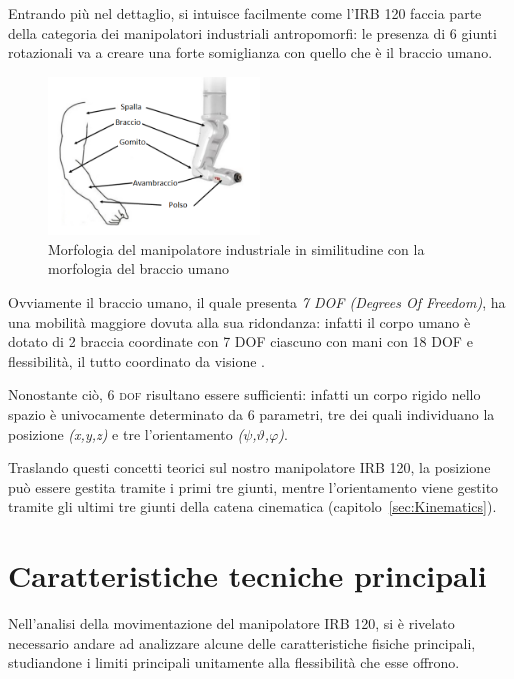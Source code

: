 Entrando più nel dettaglio, si intuisce facilmente come l'IRB 120 faccia parte della categoria dei manipolatori industriali antropomorfi: le presenza di 6 giunti rotazionali va a creare una forte somiglianza con quello che è il braccio umano.
\begin{figure}
	\centering
	\includegraphics[width=0.5\textwidth]{Immagini/BraccioUmano_IRB120}
	\caption{Morfologia del manipolatore industriale in similitudine con la morfologia del braccio umano}
	\label{fig:HumanArmIRB120}
\end{figure}

Ovviamente il braccio umano, il quale presenta \emph{7 \textsc{DOF} (Degrees Of Freedom)}, ha una mobilità maggiore dovuta alla sua ridondanza: infatti il corpo umano è dotato di 2 braccia coordinate con 7 \textsc{DOF} ciascuno con mani con 18 \textsc{DOF} e flessibilità, il tutto coordinato da visione \cite{DOF:HumanArm}.

Nonostante ciò, 6 \textsc{dof} risultano essere sufficienti: infatti un corpo rigido nello spazio è univocamente determinato da 6 parametri, tre dei quali individuano la posizione \emph{(x,y,z)} e tre l'orientamento \emph{($\psi$,$\vartheta$,$\varphi$)}.

Traslando questi concetti teorici sul nostro manipolatore IRB 120, la posizione può essere gestita tramite i primi tre giunti, mentre l'orientamento viene gestito tramite gli ultimi tre giunti della catena cinematica (capitolo~\vref{sec:Kinematics}).
\section{Caratteristiche tecniche principali}
Nell'analisi della movimentazione del manipolatore IRB 120, si è rivelato necessario andare ad analizzare alcune delle caratteristiche fisiche principali, studiandone i limiti principali unitamente alla flessibilità che esse offrono.
